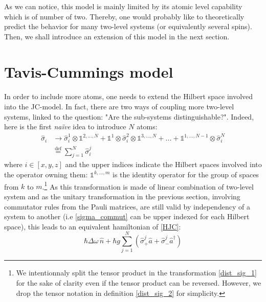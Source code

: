\documentclass[10pt]{report}
\begin{document}
As we can notice, this model is mainly limited by its atomic level capability which is of number of two. Thereby, one would probably like to theoretically predict the behavior for many two-level systems (or equivalently several spins). Then, we shall introduce an extension of this model in the next section.

\section{Tavis-Cummings model}
\paragraph{}

In order to include more atoms, one needs to extend the Hilbert space involved into the JC-model. In fact, there are two ways of coupling more two-level systems, linked to the question: "Are the sub-systems distinguishable?". Indeed, here is the first \textit{naïve} idea to introduce $N$ atoms:
\begin{align}
\label{dist_sig_1}
\hat{\sigma}_i &\rightarrow \hat{\sigma}_i^1 \otimes \mathbb{1}^{2,...,N} + \mathbb{1}^{1} \otimes \hat{\sigma}_i^2 \otimes \mathbb{1}^{3,...,N} + ... + \mathbb{1}^{1,...,N-1} \otimes \hat{\sigma}_i^N\\
\label{dist_sig_2}
&\stackrel{\text{def}}{=} \sum_{j=1}^{N} \hat{\sigma}_i^j
\end{align}
where $i \in \left[x,y,z\right]$ and the upper indices indicate the Hilbert spaces involved into the operator owning them: $\mathbb{1}^{k,...,m}$ is the identity operator for the group of spaces from $k$ to $m$.\footnote{We intentionnaly split the tensor product in the transformation \eqref{dist_sig_1} for the sake of clarity even if the tensor product can be reversed. However, we drop the tensor notation in definition \eqref{dist_sig_2} for simplicity.}
As this transformation is made of linear combination of two-level system and as the unitary transformation in the previous section, involving commutator rules from the Pauli matrices, are still valid by independency of a system to another (i.e \eqref{sigma_commut} can be upper indexed for each Hilbert space), this leads to an equivalent hamiltonian of \eqref{HJC}:
\begin{equation}
\hbar\Delta\omega\,\hat{n} + \hbar g \sum_{j=1}^{N} \left(\hat{\sigma}_+^j \hat{a} + \hat{\sigma}_-^j \hat{a}^{\dag} \right)
\end{equation}
\end{document}
